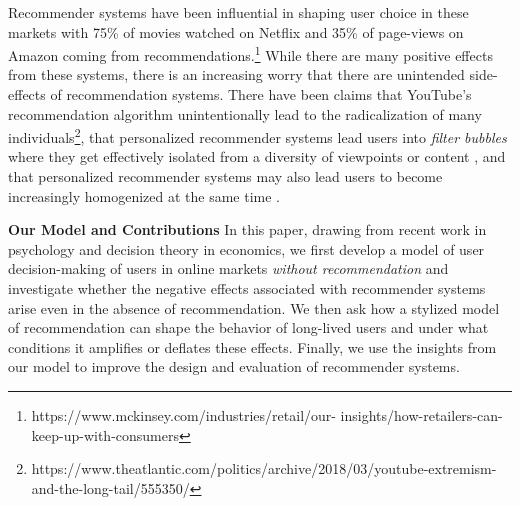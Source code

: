 \documentclass[sigconf]{acmart}
\begin{document}
Recommender systems have been influential in shaping user choice in these markets with 75\% of movies watched on Netflix and 35\% of page-views on Amazon coming from recommendations.\footnote{https://www.mckinsey.com/industries/retail/our- insights/how-retailers-can-keep-up-with-consumers} While there are many positive effects from these systems, there is an increasing worry that there are unintended side-effects of recommendation systems. There have been claims that YouTube's recommendation algorithm unintentionally lead to the radicalization of many individuals\footnote{https://www.theatlantic.com/politics/archive/2018/03/youtube-extremism-and-the-long-tail/555350/}, that personalized recommender systems lead users into \textit{filter bubbles} where they get effectively isolated from a diversity of viewpoints or content \cite{pariser2011filter}, and that personalized recommender systems may also lead users to become increasingly homogenized at the same time \cite{chaney2018algorithmic, hosanagar2013will}.

\textbf{Our Model and Contributions} In this paper, drawing from recent work in psychology and decision theory in economics, we first develop a model of user decision-making of users in online markets \textit{without recommendation} and investigate whether the negative effects associated with recommender systems arise even in the absence of recommendation. We then ask how a stylized model of recommendation can shape the behavior of long-lived users and under what conditions it amplifies or deflates these effects. Finally, we use the insights from our model to improve the design and evaluation of recommender systems.
\end{document}
